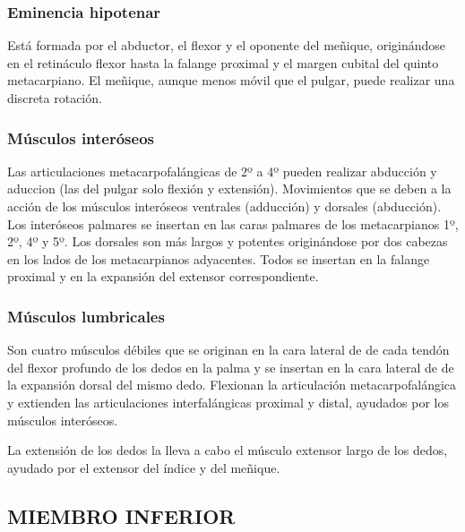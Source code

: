 \documentclass[a4paper,12pt]{article} %
\begin{document}
\begin{appendices}
\subsubsection{Eminencia hipotenar}
Está formada por el abductor, el flexor y el oponente del meñique, originándose en el retináculo flexor hasta la falange proximal y el margen cubital del quinto metacarpiano. El meñique, aunque menos móvil que el pulgar, puede realizar una discreta rotación.

\subsubsection{Músculos interóseos}
Las articulaciones metacarpofalángicas de 2º a 4º pueden realizar abducción y aduccion (las del pulgar solo flexión y extensión). Movimientos que se deben a la acción de los músculos interóseos ventrales (adducción) y dorsales (abducción). Los interóseos palmares se insertan en las caras palmares de los metacarpianos 1º, 2º, 4º y 5º. Los dorsales son más largos y potentes originándose por dos cabezas en los lados de los metacarpianos adyacentes. Todos se insertan en la falange proximal y en la expansión del extensor correspondiente.

\subsubsection{Músculos lumbricales}
Son cuatro músculos débiles que se originan en la cara lateral de de cada tendón del flexor profundo de los dedos en la palma y se insertan en la cara lateral de de la expansión dorsal del mismo dedo. Flexionan la articulación metacarpofalángica y extienden las articulaciones interfalángicas proximal y distal, ayudados por los músculos interóseos.

La extensión de los dedos la lleva a cabo el músculo extensor largo de los dedos, ayudado por el extensor del índice y del meñique.

\subsection{MIEMBRO INFERIOR}


\end{appendices}
\end{document}
